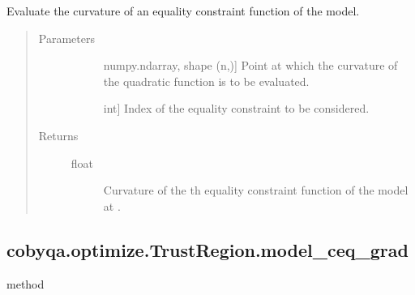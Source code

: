 \documentclass[letterpaper,10pt,english]{sphinxmanual}
\begin{document}
\begin{fulllineitems}
\begin{fulllineitems}
\label{\detokenize{refs/generated/cobyqa.optimize.TrustRegion.model_ceq_curv:cobyqa.optimize.TrustRegion.model_ceq_curv}}
\sphinxAtStartPar
Evaluate the curvature of an equality constraint function of the model.
\begin{quote}\begin{description}
\item[{Parameters}] \leavevmode\begin{description}
\item[{}] \leavevmode{[}numpy.ndarray, shape (n,){]}
\sphinxAtStartPar
Point at which the curvature of the quadratic function is to be
evaluated.

\item[{}] \leavevmode{[}int{]}
\sphinxAtStartPar
Index of the equality constraint to be considered.

\end{description}

\item[{Returns}] \leavevmode\begin{description}
\item[{float}] \leavevmode
\sphinxAtStartPar
Curvature of the \sphinxhyphen{}th equality constraint function of the model at
.

\end{description}

\end{description}\end{quote}

\end{fulllineitems}



\subsection{cobyqa.optimize.TrustRegion.model\_ceq\_grad}
\label{\detokenize{refs/generated/cobyqa.optimize.TrustRegion.model_ceq_grad:cobyqa-optimize-trustregion-model-ceq-grad}}\label{\detokenize{refs/generated/cobyqa.optimize.TrustRegion.model_ceq_grad::doc}}
\sphinxAtStartPar
method


\end{fulllineitems}
\end{document}
